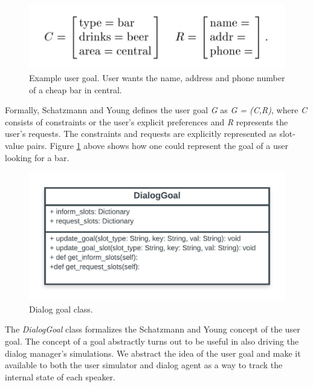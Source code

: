 \begin{figure}[h!]
	\includegraphics[scale=.35]{diagrams/schatzmann_goal_fig.jpeg}
	\caption{Example user goal. User wants the name, address and phone number of a cheap bar in central.  \cite{Schatzmann2009TheHA} }
	\label{fig:goals1}
\end{figure}

Formally, Schatzmann and Young defines the user goal \textit{G} as \textit{G = (C,R)}, where \textit{C} consists of constraints or the user's explicit preferences and \textit{R} represents the user's requests. The constraints and requests are explicitly represented as slot-value pairs. Figure \ref{fig:goals1} above shows how one could represent the goal of a user looking for a bar. 

\begin{figure}[h!]
	\centering
	\includegraphics[scale=1]{diagrams/dialog_goal_class.jpeg}
	\caption{Dialog goal class.  }
	\label{fig:goal_class}
\end{figure}

The \textit{DialogGoal} class formalizes the Schatzmann and Young concept of the user goal. The concept of a goal abstractly turns out to be useful in also driving the dialog manager's simulations. We abstract the idea of the user goal and make it available to both the user simulator and dialog agent as a way to track the internal state of each speaker. 

